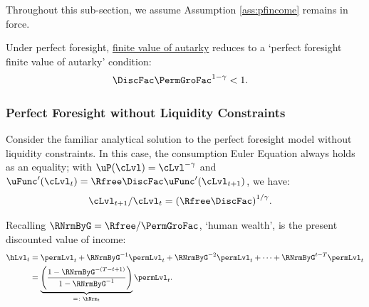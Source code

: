 \documentclass[BufferStockTheory]{subfiles}
\begin{document}
Throughout this sub-section, we assume Assumption \ref{ass:pfincome} remains in force.

%
Under perfect foresight,  \hyperlink{FVAC}{finite value of autarky} reduces to a `perfect foresight finite value of autarky' condition: 
%
\hypertarget{PFFVAC}{}
\begin{equation}\begin{gathered}\begin{aligned}  
         \DiscFac \PermGroFac^{1-\CRRA}  & <  1.  
\end{aligned}\end{gathered}\label{eq:PFFVAC}\end{equation}


\subsubsection{Perfect Foresight without Liquidity Constraints}\label{subsubsec:PFUncon}


Consider the familiar analytical solution to the perfect foresight model without liquidity constraints.
In this case, the consumption Euler Equation always holds as an equality; with $\uP(\cLvl)=\cLvl^{-\CRRA}$ and $\uFunc^{\prime}(\cLvl_{t})=\Rfree\DiscFac\uFunc^{\prime}(\cLvl_{t+1})$, we have:
%
%
\begin{equation}\begin{gathered}\begin{aligned}
  \cLvl_{t+1}/\cLvl_{t}  & = {(\Rfree\DiscFac)}^{1/\CRRA}. \label{eq:cGroFac}
\end{aligned}\end{gathered}\end{equation} 
%

Recalling $\RNrmByG  = \Rfree/\PermGroFac$, `human wealth', is the present discounted value of income:
%
% 
\begin{equation}\begin{gathered}\begin{aligned}
  \hLvl_{t}  & = \permLvl_{t}+\RNrmByG^{-1} \permLvl_{t} + \RNrmByG^{-2} \permLvl_{t} + \cdots + \RNrmByG^{t-T} \permLvl_{t} \notag
  \\  & = \underbrace{\left(\frac{1-\RNrmByG^{-(T-t+1)}}{1-\RNrmByG^{-1}}\right)}_{ = \colon \hNrm_{t}}\permLvl_{t} \label{eq:HDef}.
\end{aligned}\end{gathered}\end{equation}
\end{document}
